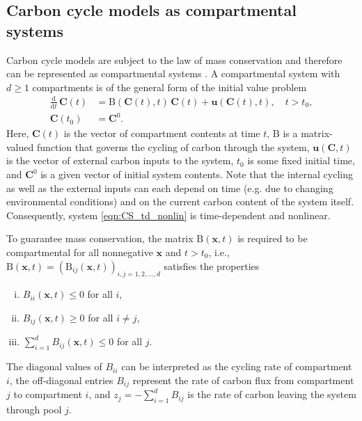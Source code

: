 \documentclass[11pt,a4paper]{article}
\renewcommand{\vec}[1]{\mathbf{#1}}
\newcommand{\tens}[1]{\mathrm{#1}}
\newcommand{\deriv}[1]{\frac{\mathrm{d}}{\mathrm{d}#1}}
\newcommand{\suml}{\sum\limits}
\begin{document}
\subsection{Carbon cycle models as compartmental systems}
Carbon cycle models are subject to the law of mass conservation and therefore can be represented as compartmental systems \citep{Anderson1983, Jacquez1993}. A compartmental system with $d\geq1$ compartments is of the general form of the initial value problem
    \begin{equation}\label{eqn:CS_td_nonlin}
        \begin{aligned}
            \deriv{t}\,\vec{C}(t) &= \tens{B}(\vec{C}(t),t)\,\vec{C}(t) + \vec{u}(\vec{C}(t),t),\quad t>t_0,\\
            \vec{C}(t_0) &= \vec{C}^0.
        \end{aligned}
    \end{equation}Here, $\vec{C}(t)$ is the vector of compartment contents at time $t$, $\tens{B}$ is a matrix-valued function that governs the cycling of carbon through the system, $\vec{u}(\vec{C},t)$ is the vector of external carbon inputs to the system, $t_0$ is some fixed initial time, and $\vec{C}^0$ is a given vector  of initial system contents. Note that the internal cycling as well as the external inputs can each depend on time (e.g. due to changing environmental conditions) and on the current carbon content of the system itself. Consequently, system \eqref{eqn:CS_td_nonlin} is time-dependent and nonlinear.
    
To guarantee mass conservation, the matrix $\tens{B}(\vec{x},t)$ is required to be compartmental 
for all nonnegative $\vec{x}$ and $t>t_0$, i.e., $\tens{B}(\vec{x},t)=(\tens{B}_{ij}(\vec{x},t))_{i,j=1,2,\ldots,d}$ satisfies the properties
    \begin{enumerate}[(i)]
        \item $B_{ii}(\vec{x},t)\leq0$ for all $i$,
        \item $B_{ij}(\vec{x},t)\geq0$ for all $i\neq j$,
        \item $\suml_{i=1}^d B_{ij}(\vec{x},t)\leq0$ for all $j$.
    \end{enumerate}
The diagonal values of $B_{ii}$ can be interpreted as the cycling rate of compartment $i$, the off-diagonal entries $B_{ij}$ represent the rate of carbon flux from compartment $j$ to compartment $i$, and $z_j=-\sum_{i=1}^d B_{ij}$ is the rate of carbon leaving the system through pool $j$.
    
\end{document}
